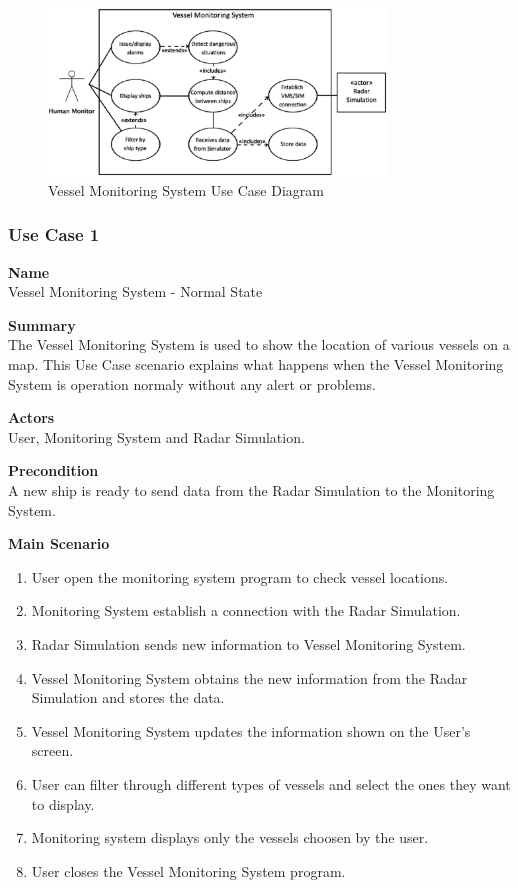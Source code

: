 \begin{figure}[h]
\caption{Vessel Monitoring System Use Case Diagram}
\includegraphics[width=0.8\textwidth]{vmsdiagram.eps}
\end{figure}

\subsubsection{Use Case 1} \label{uc:1}

\noindent
{\bf Name}\\
Vessel Monitoring System - Normal State

\noindent
{\bf Summary}\\
The Vessel Monitoring System is used to show the location of various vessels on a map. This Use Case scenario explains what happens when the Vessel Monitoring System is operation normaly without any alert or problems.

\noindent
{\bf Actors}\\
User, Monitoring System and Radar Simulation.

\noindent
{\bf Precondition}\\
A new ship is ready to send data from the Radar Simulation to the Monitoring System.

\noindent
{\bf Main Scenario}\\
\vspace*{-0.2in}
\begin{enumerate}
\item User open the monitoring system program to check vessel locations.
\item Monitoring System establish a connection with the Radar Simulation.
\item Radar Simulation sends new information to Vessel Monitoring System.
\item Vessel Monitoring System obtains the new information from the Radar Simulation and stores the data.
\item Vessel Monitoring System updates the information shown on the User's screen.
\item User can filter through different types of vessels and select the ones they want to display.
\item Monitoring system displays only the vessels choosen by the user.
\item User closes the Vessel Monitoring System program.
\end{enumerate}


